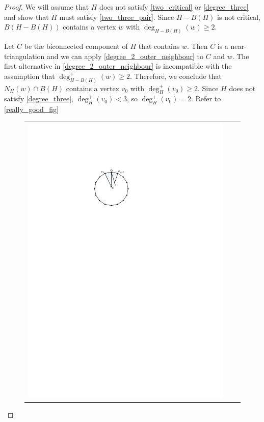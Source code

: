 \documentclass{article}
\theoremstyle{definition}
\begin{document}
\begin{proof}
  We will assume that $H$ does not satisfy \cref{two_critical} or \cref{degree_three} and show that $H$ must satisfy \cref{two_three_pair}.  Since $H-B(H)$ is not critical, $B(H-B(H))$ contains a vertex $w$ with $\deg_{H-B(H)}(w)\ge 2$.

  Let $C$ be the biconnected component of $H$ that contains $w$.  Then $C$ is a near-triangulation and we can apply \cref{degree_2_outer_neighbour} to $C$ and $w$. The first alternative in \cref{degree_2_outer_neighbour} is incompatible with the assumption that $\deg^+_{H-B(H)}(w)\ge 2$.  Therefore, we conclude that $N_H(w)\cap B(H)$ contains a vertex $v_0$ with $\deg^+_H(v_0)\ge 2$.  Since $H$ does not satisfy \cref{degree_three}, $\deg^+_H(v_0)< 3$, so $\deg^+_H(v_0)=2$.  Refer to \cref{really_good_fig}
  \begin{figure}
    \centering
    \begin{tabular}{ccc}
      \includegraphics[page=1]{figs/really_good} &

\end{tabular}
\end{figure}
\end{proof}
\end{document}
